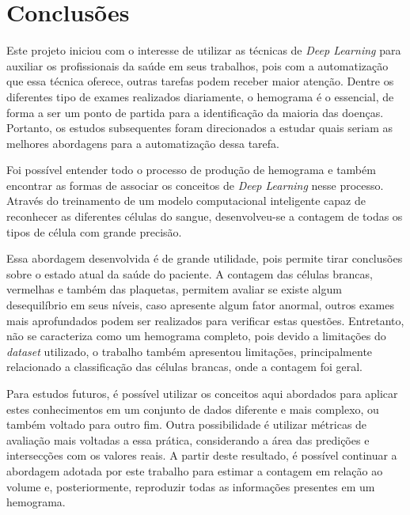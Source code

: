 \chapter{Conclusões}
\label{chap:conclusoes}

Este projeto iniciou com o interesse de utilizar as técnicas de \emph{Deep Learning} para auxiliar os profissionais da saúde em seus trabalhos, pois com a automatização que essa técnica oferece, outras tarefas podem receber maior atenção. Dentre os diferentes tipo de exames realizados diariamente, o hemograma é o essencial, de forma a ser um ponto de partida para a identificação da maioria das doenças. Portanto, os estudos subsequentes foram direcionados a estudar quais seriam as melhores abordagens para a automatização dessa tarefa.

Foi possível entender todo o processo de produção de hemograma e também encontrar as formas de associar os conceitos de \emph{Deep Learning} nesse processo. Através do treinamento de um modelo computacional inteligente capaz de reconhecer as diferentes células do sangue, desenvolveu-se a contagem de todas os tipos de célula com grande precisão.

Essa abordagem desenvolvida é de grande utilidade, pois permite tirar conclusões sobre o estado atual da saúde do paciente. A contagem das células brancas, vermelhas e também das plaquetas, permitem avaliar se existe algum desequilíbrio em seus níveis, caso apresente algum fator anormal, outros exames mais aprofundados podem ser realizados para verificar estas questões. Entretanto, não se caracteriza como um hemograma completo, pois devido a limitações do \emph{dataset} utilizado, o trabalho também apresentou limitações, principalmente relacionado a classificação das células brancas, onde a contagem foi geral.

Para estudos futuros, é possível utilizar os conceitos aqui abordados para aplicar estes conhecimentos em um conjunto de dados diferente e mais complexo, ou também voltado para outro fim. Outra possibilidade é utilizar métricas de avaliação mais voltadas a essa prática, considerando a área das predições e intersecções com os valores reais. A partir deste resultado, é possível continuar a abordagem adotada por este trabalho para estimar a contagem em relação ao volume e, posteriormente, reproduzir todas as informações presentes em um hemograma.

